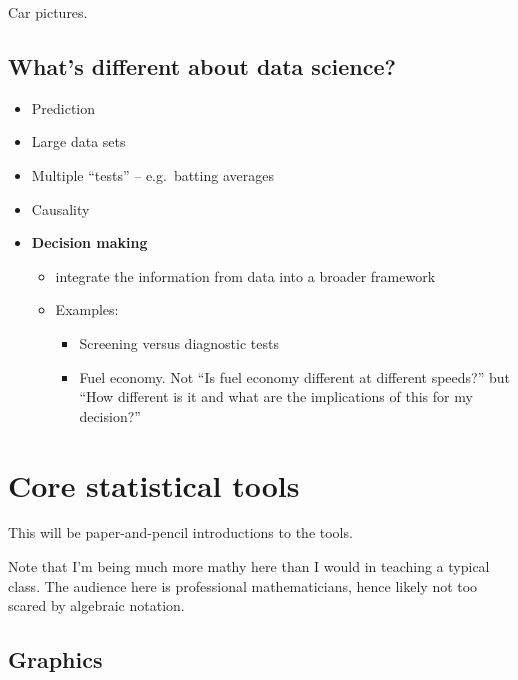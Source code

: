 \documentclass[]{book}
\providecommand{\tightlist}{%
  \setlength{\itemsep}{0pt}\setlength{\parskip}{0pt}}
\begin{document}
Car pictures.

\hypertarget{whats-different-about-data-science}{%
\section{What's different about data science?}\label{whats-different-about-data-science}}

\begin{itemize}
\tightlist
\item
  Prediction
\item
  Large data sets
\item
  Multiple ``tests'' -- e.g.~batting averages
\item
  Causality
\item
  \textbf{Decision making}

  \begin{itemize}
  \tightlist
  \item
    integrate the information from data into a broader framework
  \item
    Examples:

    \begin{itemize}
    \tightlist
    \item
      Screening versus diagnostic tests
    \item
      Fuel economy. Not ``Is fuel economy different at different speeds?'' but ``How different is it and what are the implications of this for my decision?''
    \end{itemize}
  \end{itemize}
\end{itemize}

\hypertarget{core-statistical-tools}{%
\chapter{Core statistical tools}\label{core-statistical-tools}}

This will be paper-and-pencil introductions to the tools.

Note that I'm being much more mathy here than I would in teaching a typical class. The audience here is professional mathematicians, hence likely not too scared by algebraic notation.

\hypertarget{graphics}{%
\section{Graphics}\label{graphics}}
\end{document}

